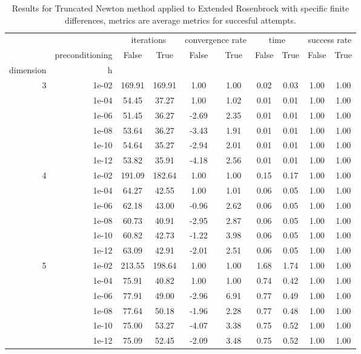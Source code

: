 \begin{table}
\centering
\caption{Results for Truncated Newton method applied to Extended Rosenbrock with specific finite differences, metrics are average metrics for succesful attempts.}
\label{tab:Truncated_Newton_Extended_Rosenbrock_fd_rel}
\begin{tabular}{rr|cc|cc|cc|cc}
\toprule
    &  & \multicolumn{2}{|c}{iterations} & \multicolumn{2}{|c}{convergence rate} & \multicolumn{2}{|c}{time} & \multicolumn{2}{|c}{success rate} \\
    & preconditioning & False & True & False & True & False & True & False & True \\
dimension & h &  &  &  &  &  &  &  &  \\
\midrule
\multirow[t]{6}{*}{3} & 1e-02 & 169.91 & 169.91 & 1.00 & 1.00 & 0.02 & 0.03 & 1.00 & 1.00 \\
    & 1e-04 & 54.45 & 37.27 & 1.00 & 1.02 & 0.01 & 0.01 & 1.00 & 1.00 \\
    & 1e-06 & 51.45 & 36.27 & -2.69 & 2.35 & 0.01 & 0.01 & 1.00 & 1.00 \\
    & 1e-08 & 53.64 & 36.27 & -3.43 & 1.91 & 0.01 & 0.01 & 1.00 & 1.00 \\
    & 1e-10 & 54.64 & 35.27 & -2.94 & 2.01 & 0.01 & 0.01 & 1.00 & 1.00 \\
    & 1e-12 & 53.82 & 35.91 & -4.18 & 2.56 & 0.01 & 0.01 & 1.00 & 1.00 \\
\cline{1-10}
\multirow[t]{6}{*}{4} & 1e-02 & 191.09 & 182.64 & 1.00 & 1.00 & 0.15 & 0.17 & 1.00 & 1.00 \\
    & 1e-04 & 64.27 & 42.55 & 1.00 & 1.01 & 0.06 & 0.05 & 1.00 & 1.00 \\
    & 1e-06 & 62.18 & 43.00 & -0.96 & 2.62 & 0.06 & 0.05 & 1.00 & 1.00 \\
    & 1e-08 & 60.73 & 40.91 & -2.95 & 2.87 & 0.06 & 0.05 & 1.00 & 1.00 \\
    & 1e-10 & 60.82 & 42.73 & -1.22 & 3.98 & 0.06 & 0.05 & 1.00 & 1.00 \\
    & 1e-12 & 63.09 & 42.91 & -2.01 & 2.51 & 0.06 & 0.05 & 1.00 & 1.00 \\
\cline{1-10}
\multirow[t]{6}{*}{5} & 1e-02 & 213.55 & 198.64 & 1.00 & 1.00 & 1.68 & 1.74 & 1.00 & 1.00 \\
    & 1e-04 & 75.91 & 40.82 & 1.00 & 1.00 & 0.74 & 0.42 & 1.00 & 1.00 \\
    & 1e-06 & 77.91 & 49.00 & -2.96 & 6.91 & 0.77 & 0.49 & 1.00 & 1.00 \\
    & 1e-08 & 77.64 & 50.18 & -1.96 & 2.28 & 0.77 & 0.48 & 1.00 & 1.00 \\
    & 1e-10 & 75.00 & 53.27 & -4.07 & 3.38 & 0.75 & 0.52 & 1.00 & 1.00 \\
    & 1e-12 & 75.09 & 52.45 & -2.09 & 3.48 & 0.75 & 0.52 & 1.00 & 1.00 \\
\cline{1-10}
\bottomrule
\end{tabular}
\end{table}
